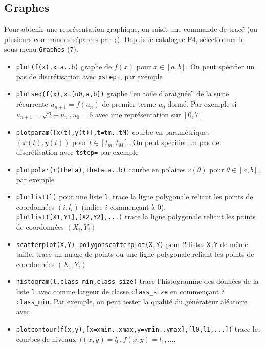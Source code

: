 \documentclass{article}
\begin{document}
\begin{giacjshere}
\section{Graphes}
Pour obtenir une repr\'esentation graphique, on saisit une commande
de trac\'e (ou plusieurs commandes s\'epar\'ees par \verb|;|).
Depuis le catalogue F4, s\'electionner le sous-menu \verb|Graphes|
(7).
\begin{itemize}
\item \verb|plot(f(x),x=a..b)| graphe de $f(x)$ pour $x\in [a,b]$.
On peut sp\'ecifier un pas de discr\'etisation avec \verb|xstep=|,
par exemple 
\item \verb|plotseq(f(x),x=[u0,a,b])| graphe ``en toile d'araign\'ee''
de la suite r\'ecurrente $u_{n+1}=f(u_n)$ de premier terme $u_0$ donn\'e.
Par exemple si $u_{n+1}=\sqrt{2+u_n}, u_0=6$ avec une repr\'esentation
sur $[0,7]$
\item \verb|plotparam([x(t),y(t)],t=tm..tM)| courbe en param\'etriques
$(x(t),y(t))$ pour $t\in [t_m,t_M]$.
On peut sp\'ecifier un pas de discr\'etisation avec \verb|tstep=|
par exemple
\item \verb|plotpolar(r(theta),theta=a..b)| courbe
en polaires $r(\theta)$ pour $\theta \in [a,b]$,
par exemple
\item \verb|plotlist(l)| pour une liste \verb|l|,
trace la ligne polygonale reliant
les points de coordonn\'ees $(i,l_i)$ (indice $i$ commen\c{c}ant \`a 0).\\
\verb|plotlist([X1,Y1],[X2,Y2],...)| 
trace la ligne polygonale reliant
les points de coordonn\'ees $(X_i,Y_i)$ 
\item \verb|scatterplot(X,Y)|, \verb|polygonscatterplot(X,Y)|
pour 2 listes \verb|X,Y| de m\^eme taille, trace un nuage de points
ou une ligne polygonale reliant
les points de coordonn\'ees $(X_i,Y_i)$ 
\item \verb|histogram(l,class_min,class_size)| trace
l'histogramme des donn\'ees de la liste \verb|l| avec
comme largeur de classe \verb|class_size| en commen\c{c}ant
\`a \verb|class_min|. Par exemple, on peut tester la qualit\'e
du g\'en\'erateur al\'eatoire avec
\item \verb|plotcontour(f(x,y),[x=xmin..xmax,y=ymin..ymax],[l0,l1,...])|
trace les courbes de niveaux $f(x,y)=l_0, f(x,y)=l_1, ...$.

\end{itemize}
\end{giacjshere}
\end{document}
